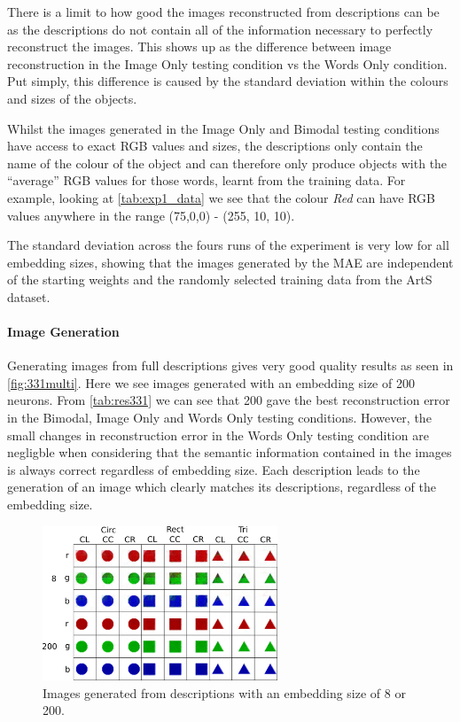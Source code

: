 There is a limit to how good the images reconstructed from descriptions can be as the descriptions do not contain all of the information necessary to perfectly reconstruct the images. This shows up as the difference between image reconstruction in the Image Only testing condition vs the Words Only condition. Put simply, this difference is caused by the standard deviation within the colours and sizes of the objects. 

Whilst the images generated in the Image Only and Bimodal testing conditions have access to exact RGB values and sizes, the descriptions only contain the name of the colour of the object and can therefore only produce objects with the ``average'' RGB values for those words, learnt from the training data. For example, looking at \autoref{tab:exp1_data} we see that the colour \textit{Red} can have RGB values anywhere in the range (75,0,0) - (255, 10, 10).

The standard deviation across the fours runs of the experiment is very low for all embedding sizes, showing that the images generated by the MAE are independent of the starting weights and the randomly selected training data from the ArtS dataset. 

\paragraph{Image Generation}

Generating images from full descriptions gives very good quality results as seen in \autoref{fig:331multi}. Here we see images generated with an embedding size of 200 neurons. From \autoref{tab:res331} we can see that 200 gave the best reconstruction error in the Bimodal, Image Only and Words Only testing conditions. However, the small changes in reconstruction error in the Words Only testing condition are negligble when considering that the semantic information contained in the images is always correct regardless of embedding size. Each description leads to the generation of an image which clearly matches its descriptions, regardless of the embedding size. 

\begin{figure}
\centering
\includegraphics[width=0.625\textwidth]{Figs/shapes/331_8v200.png}
\caption{Images generated from descriptions with an embedding size of 8 or 200.}
\label{fig:331multi}
\end{figure}

